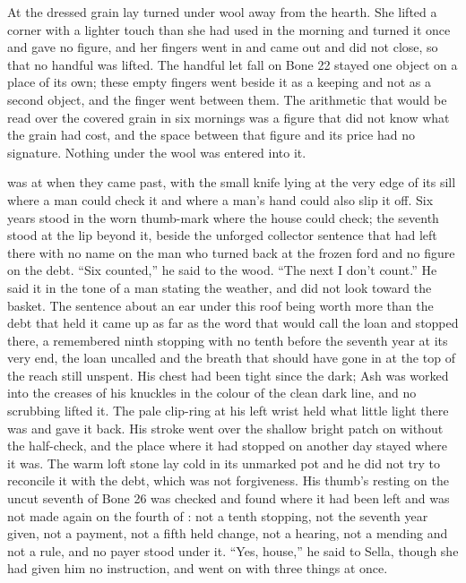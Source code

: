 At  the dressed grain lay turned under wool away from the hearth. She lifted a corner with a lighter touch than she had used in the morning and turned it once and gave no figure, and her fingers went in and came out and did not close, so that no handful was lifted. The handful let fall on Bone 22 stayed one object on a place of its own; these empty fingers went beside it as a keeping and not as a second object, and the finger went between them. The arithmetic that would be read over the covered grain in six mornings was a figure that did not know what the grain had cost, and the space between that figure and its price had no signature. Nothing under the wool was entered into it.

 was at  when they came past, with the small knife lying at the very edge of its sill where a man could check it and where a man's hand could also slip it off. Six years stood in the worn thumb-mark where the house could check; the seventh stood at the lip beyond it, beside the unforged collector sentence that  had left there with no name on the man who turned back at the frozen ford and no figure on the debt. “Six counted,” he said to the wood. “The next I don't count.” He said it in the tone of a man stating the weather, and did not look toward the basket. The sentence about an ear under this roof being worth more than the debt that held it came up as far as the word that would call the loan and stopped there, a remembered ninth stopping with no tenth before the seventh year at its very end, the loan uncalled and the breath that should have gone in at the top of the reach still unspent. His chest had been tight since the dark; Ash was worked into the creases of his knuckles in the colour of the clean dark line, and no scrubbing lifted it. The pale clip-ring at his left wrist held what little light there was and gave it back. His stroke went over the shallow bright patch on  without the half-check, and the place where it had stopped on another day stayed where it was. The warm loft stone lay cold in its unmarked pot and he did not try to reconcile it with the debt, which was not forgiveness. His thumb's resting on the uncut seventh of Bone 26 was checked and found where it had been left and was not made again on the fourth of : not a tenth stopping, not the seventh year given, not a payment, not a fifth held change, not a hearing, not a mending and not a rule, and no payer stood under it. “Yes, house,” he said to Sella, though she had given him no instruction, and went on with three things at once.

